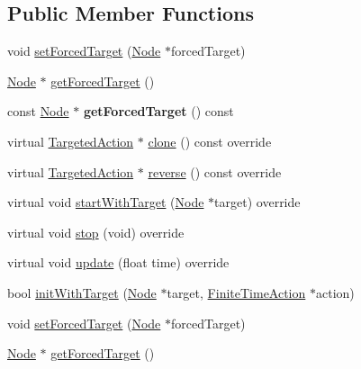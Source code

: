 \subsection*{Public Member Functions}
\begin{DoxyCompactItemize}
\item 
void \hyperlink{classTargetedAction_a8a5c10c4a6f2ffefc28867da3fe8a159}{set\+Forced\+Target} (\hyperlink{classNode}{Node} $\ast$forced\+Target)
\item 
\hyperlink{classNode}{Node} $\ast$ \hyperlink{classTargetedAction_a3cc3da2403fbc082d8799c867ba7ae38}{get\+Forced\+Target} ()
\item 
\mbox{\label{classTargetedAction_a76c0bd35ad5e056d8ed50cee3160e913}} 
const \hyperlink{classNode}{Node} $\ast$ {\bfseries get\+Forced\+Target} () const
\item 
virtual \hyperlink{classTargetedAction}{Targeted\+Action} $\ast$ \hyperlink{classTargetedAction_ad94083c7a370faebf4ca01499c6ebf6a}{clone} () const override
\item 
virtual \hyperlink{classTargetedAction}{Targeted\+Action} $\ast$ \hyperlink{classTargetedAction_a58dc5d2de3cecda888ae57c299cc6c1c}{reverse} () const override
\item 
virtual void \hyperlink{classTargetedAction_a4e8be95b436457dd7b297f02ca5bf842}{start\+With\+Target} (\hyperlink{classNode}{Node} $\ast$target) override
\item 
virtual void \hyperlink{classTargetedAction_a688769917c245a9f885bbe49a73e37fa}{stop} (void) override
\item 
virtual void \hyperlink{classTargetedAction_a031468e095f1c4693a5e265664f7c337}{update} (float time) override
\item 
bool \hyperlink{classTargetedAction_ab1de67f9331ac62396a6c22f7c7a6b67}{init\+With\+Target} (\hyperlink{classNode}{Node} $\ast$target, \hyperlink{classFiniteTimeAction}{Finite\+Time\+Action} $\ast$action)
\item 
void \hyperlink{classTargetedAction_a8a5c10c4a6f2ffefc28867da3fe8a159}{set\+Forced\+Target} (\hyperlink{classNode}{Node} $\ast$forced\+Target)
\item 
\hyperlink{classNode}{Node} $\ast$ \hyperlink{classTargetedAction_a3cc3da2403fbc082d8799c867ba7ae38}{get\+Forced\+Target} ()
\item 
\mbox{\label{classTargetedAction_a76c0bd35ad5e056d8ed50cee3160e913}} 

\end{DoxyCompactItemize}
